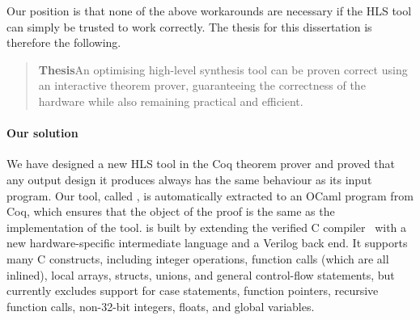 
Our position is that none of the above workarounds are necessary if the HLS tool
can simply be trusted to work correctly.  The thesis for this dissertation is
therefore the following.

\begin{samepage}
  \begin{quote}
    \textbf{Thesis}\quad An optimising high-level synthesis tool can be proven
    correct using an interactive theorem prover, guaranteeing the correctness of
    the hardware while also remaining practical and efficient.
  \end{quote}
\end{samepage}


\paragraph{Our solution}
We have designed a new HLS tool in the Coq theorem prover and proved that any
output design it produces always has the same behaviour as its input program.
Our tool, called \vericert{}, is automatically extracted to an OCaml program
from Coq, which ensures that the object of the proof is the same as the
implementation of the tool.  \vericert{} is built by extending the \compcert{}
verified C compiler~\cite{leroy09_formal_verif_realis_compil} with a new
hardware-specific intermediate language and a Verilog back end.  It supports
many C constructs, including integer operations, function calls (which are all
inlined), local arrays, structs, unions, and general control-flow statements,
but currently excludes support for case statements, function pointers, recursive
function calls, non-32-bit integers, floats, and global variables.

